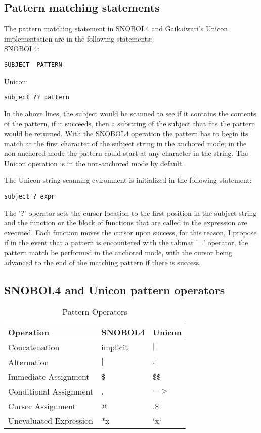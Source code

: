\documentclass{article}
\begin{document}
\subsection{Pattern matching statements}
The pattern matching statement in SNOBOL4 and Gaikaiwari's Unicon implementation are in the following statements:\\

\noindent
SNOBOL4:
\begin{verbatim}
SUBJECT  PATTERN
\end{verbatim}
\noindent
Unicon:
\begin{verbatim}
subject ?? pattern
\end{verbatim}

In the above lines, the subject would be scanned to see if it contains the contents of the pattern, if it succeeds, then a substring of the subject that fits the pattern would be returned.  With the SNOBOL4 operation the pattern has to begin its match at the first character of the subject string in the anchored mode; in the non-anchored mode the pattern could start at any character in the string. \cite{Snobol}  The Unicon operation is in the non-anchored mode by default. \cite{Gaikaiwari2005}

The Unicon string scanning evironment is initialized in the following statement:

\begin{verbatim}
subject ? expr
\end{verbatim}

The '?' operator sets the cursor location to the first position in the subject string and the function or the block of functions that are called in the expression are executed.  Each function moves the cursor upon success, for this reason, I propose if in the event that a pattern is encountered with the tabmat '=' operator, the pattern match be performed in the anchored mode, with the cursor being advanced to the end of the matching pattern if there is success.

\subsection{SNOBOL4 and Unicon pattern operators}



\begin{table}[ht]
	\caption{Pattern Operators}
	\centering
	\begin{tabular}{|l|l|l|}
		\hline\hline
		Operation & SNOBOL4 & Unicon \\
		\hline
		Concatenation & implicit & $||$ \\
		Alternation & $|$ & $.|$ \\
		Immediate Assignment & \$ & \$\$ \\
		Conditional Assignment & . & $->$ \\
		Cursor Assignment & @ & .\$ \\
		Unevaluated Expression & $*$x & `x` \\
		\hline
	\end{tabular}
\end{table}
\end{document}
